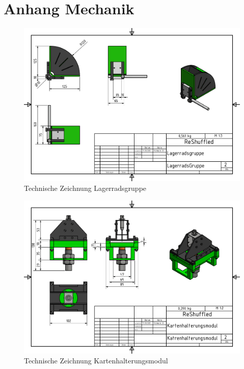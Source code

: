 \renewcommand\appendixname{Anhang}
\renewcommand\appendixpagename{Anhang}
\renewcommand\appendixtocname{Anhang}

\lohead{}

\appendix
\begingroup
\makeatletter
\let\ps@plain\ps@empty
\appendixpage
\makeatother
\endgroup

\chapter{Anhang Mechanik}

\begin{figure}
    \centering
    \includegraphics[scale=0.85,page=1, rotate=90]{fig/mech/LagerradsGruppe.pdf}
    \caption{Technische Zeichnung Lagerradsgruppe}
\end{figure}

\begin{figure}
    \centering
    \includegraphics[scale=0.85,page=1]{fig/mech/Katrenhalterungsmodul.pdf}
    \caption{Technische Zeichnung Kartenhalterungsmodul}
\end{figure}

